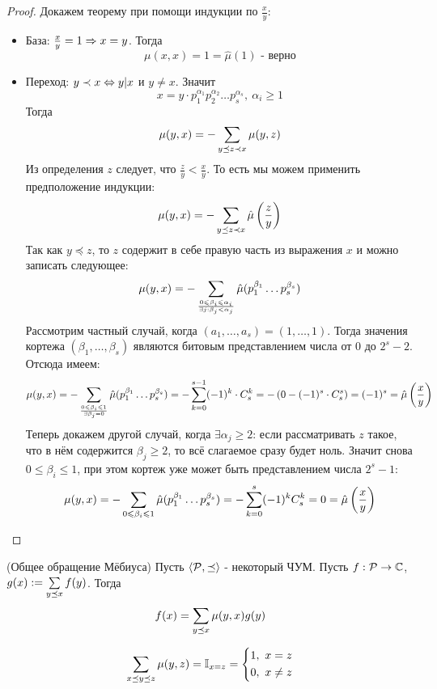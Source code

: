 \begin{proof}
	Докажем теорему при помощи индукции по $\frac{x}{y}$:
	\begin{itemize}
		\item База: $\frac{x}{y} = 1 \Rightarrow x = y$. Тогда
		\[
			\mu(x, x) = 1 = \hat{\mu}(1) \text{ - верно}
		\]
		
		\item Переход: $y \prec x \Leftrightarrow y | x$ и $y \neq x$. Значит
		\[
			x = y \cdot p_1^{\alpha_1} p_2^{\alpha_2} \ldots p_s^{\alpha_s},\ \alpha_i \ge 1
		\]
		Тогда
		\[
			\mu(y, x) = -\sum\limits_{y \preceq z \prec x} \mu(y, z)
		\]
		Из определения $z$ следует, что $\frac{z}{y} < \frac{x}{y}$. То есть мы можем применить предположение индукции:
		\[
			\mu(y, x) = -\sum\limits_{y \preceq z \prec x} \hat{\mu}\left(\frac{z}{y}\right)
		\]
		Так как $y \preceq z$, то $z$ содержит в себе правую часть из выражения $x$ и можно записать следующее:
		\[
			\mu(y, x) = -\sum\limits_{{0 \leqslant \beta_i \leqslant \alpha_i} \over {\exists j : \beta_j < \alpha_j}} \hat{\mu}(p_1^{\beta_1} \ldots p_s^{\beta_s})
		\]
		Рассмотрим частный случай, когда $(a_1, \ldots, a_s) = (1, \ldots, 1)$. Тогда значения кортежа $(\beta_1, \ldots, \beta_s)$ являются битовым представлением числа от $0$ до $2^s - 2$. Отсюда имеем:
		\[
			\mu(y, x) = -\sum\limits_{{0 \leqslant \beta_i \leqslant 1} \over {\exists \beta_j = 0}} \hat{\mu}(p_1^{\beta_1} \ldots p_s^{\beta_s}) = -\sum\limits_{k = 0}^{s - 1} (-1)^k \cdot C_s^k = - \left(0 - (-1)^s \cdot C_s^s\right) = (-1)^s = \hat{\mu}\left(\frac{x}{y}\right)
		\]
		Теперь докажем другой случай, когда $\exists \alpha_j \ge 2$: если рассматривать $z$ такое, что в нём содержится $\beta_j \ge 2$, то всё слагаемое сразу будет ноль. Значит снова $0 \le \beta_i \le 1$, при этом кортеж уже может быть представлением числа $2^s - 1$:
		\[
			\mu(y, x) = -\sum\limits_{{0 \leqslant \beta_i \leqslant 1}} \hat{\mu}(p_1^{\beta_1} \ldots p_s^{\beta_s}) = -\sum\limits_{k = 0}^s (-1)^k C_s^k = 0 = \hat{\mu}\left(\frac{x}{y}\right)
		\]
	\end{itemize}
\end{proof}

\begin{theorem} (Общее обращение Мёбиуса) \label{globMebius}
	Пусть $\langle\mathcal{P}, \preceq\rangle$ - некоторый ЧУМ. Пусть $f: \mathcal{P} \rightarrow \mathbb{C}$, $g(x) := \sum\limits_{y \preceq x} f(y)$. Тогда
	\[
		f(x) = \sum\limits_{y \preceq x} \mu(y, x) g(y)
	\]
\end{theorem}

\begin{lemma}
	\[
		\sum\limits_{x \preceq y \preceq z} \mu(y, z) = \mathbb{I}_{x = z} = \left\{\begin{aligned}
			&{1,\ x = z}
			\\
			&{0,\ x \neq z}
		\end{aligned}\right.
	\]
\end{lemma}


